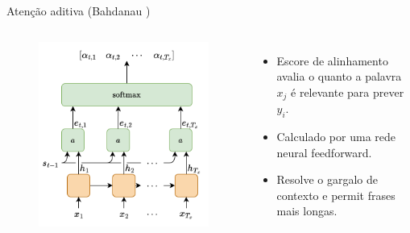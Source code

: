 \documentclass{beamer}
\begin{document}
\begin{frame}{Atenção aditiva (Bahdanau \cite{bahdanau2014neural})}
\begin{columns}[t]
		\vspace{-8mm}
		\begin{figure}[h]
			\centering
			\includegraphics[height=0.55\textheight]{assets/Bahdanau-Alignment.png}
		\end{figure}
		\vspace{-3mm}
		\small
		\begin{itemize}
			\item Escore de alinhamento avalia o quanto a palavra $x_j$ é relevante para prever $y_i$.
			\item Calculado por uma rede neural feedforward.
      \item Resolve o gargalo de contexto e permit frases mais longas.
		\end{itemize}

	\end{columns}

\end{frame}
\end{document}
